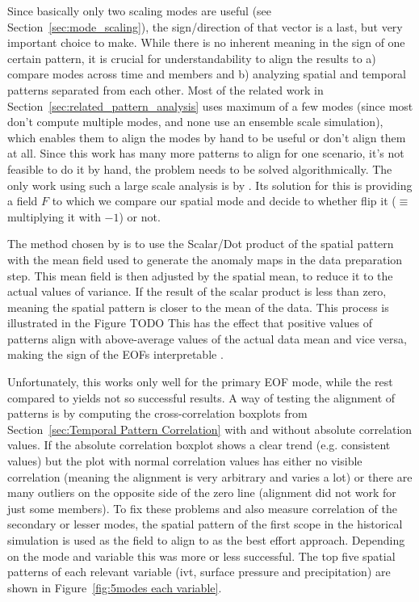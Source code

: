 Since basically only two scaling modes are useful (see Section~\ref{sec:mode_scaling}), the sign/direction of that vector is a last, but very important choice to make.
While there is no inherent meaning in the sign of one certain pattern, it is crucial for understandability to align the results to a) compare modes across time and members and b) analyzing spatial and temporal patterns separated from each other. 
Most of the related work in Section~\ref{sec:related_pattern_analysis} uses maximum of a few modes (since most don't compute multiple modes, and none use an ensemble scale simulation), which enables them to align the modes by hand to be useful or don't align them at all.
Since this work has many more patterns to align for one scenario, it's not feasible to do it by hand, the problem needs to be solved algorithmically. 
The only work using such a large scale analysis is by \citeauthor{vietinghoffdiss} \cite{vietinghoffdiss}.  
Its solution for this is providing a field $F$ to which we compare our spatial mode and decide to whether flip it ($\equiv$ multiplying it with $-1$) or not. 

The method chosen by \citeauthor{vietinghoffdiss} \cite{vietinghoffdiss} is to use the Scalar/Dot product of the spatial pattern with the mean field used to generate the anomaly maps in the data preparation step. 
This mean field is then adjusted by the spatial mean, to reduce it to the actual values of variance. 
If the result of the scalar product is less than zero, meaning the spatial pattern is closer to the mean of the data. 
This process is illustrated in the Figure TODO  
This has the effect that positive values of patterns align with above-average values of the actual data mean and vice versa, making the sign of the EOFs interpretable \cite{vietinghoffdiss}.  

Unfortunately, this works only well for the primary EOF mode, while the rest compared to yields not so successful results. 
A way of testing the alignment of patterns is by computing the cross-correlation boxplots from Section~\ref{sec:Temporal Pattern Correlation} with and without absolute correlation values. 
If the absolute correlation boxplot shows a clear trend (e.g. consistent values) but the plot with normal correlation values has either no visible correlation (meaning the alignment is very arbitrary and varies a lot) or there are many outliers on the opposite side of the zero line (alignment did not work for just some members). 
To fix these problems and also measure correlation of the secondary or lesser modes, the spatial pattern of the first scope in the historical simulation is used as the field to align to as the best effort approach. Depending on the mode and variable this was more or less successful. 
The top five spatial patterns of each relevant variable (\ac{ivt}, surface pressure and precipitation) are shown in Figure~\ref{fig:5modes each variable}.



